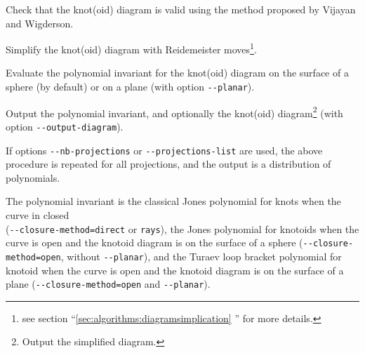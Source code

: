 Check that the knot(oid) diagram is valid using the method proposed by Vijayan and Wigderson\cite{Vijayan1982}.

Simplify the knot(oid) diagram with  Reidemeister moves\footnote{see section  ``\ref{sec:algorithms:diagramsimplication} '' for more details.}.

Evaluate the polynomial invariant for the knot(oid) diagram on the surface of a sphere (by default) or on a plane (with option \lstinline{--planar}).

Output the polynomial invariant, and optionally the knot(oid) diagram\footnote{Output the simplified diagram.} (with option \lstinline{--output-diagram}).

If options \lstinline{--nb-projections} or  \lstinline{--projections-list} are used, the above procedure is repeated for all projections, and the output is a distribution of polynomials.

The polynomial invariant is the classical Jones polynomial for knots\cite{jones} when the curve in closed\\
(\lstinline{--closure-method=direct} or \lstinline{rays}), the Jones polynomial for knotoids\cite{turaev,guka} when the curve is open and the knotoid diagram is on the surface of a sphere (\lstinline{--closure-method=open}, without \lstinline{--planar}), and the Turaev loop bracket polynomial for knotoid\cite{turaev}  when the curve is open and the knotoid diagram is on the surface of a plane (\lstinline{--closure-method=open} and \lstinline{--planar}).


